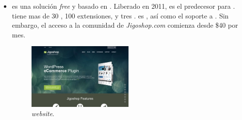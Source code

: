 \begin{itemize}
	\item \textbf{\nameJigoshop} es una solución \ecommerce \textit{free} y \opensource basado en \wordPress. Liberado en 2011, \nameJigoshop es el predecesor para \nameWooCommerce. \nameJigoshop tiene mas de 30   \themes, 100 extensiones, y tres \theme \frameworks. \nameJigoshop es  \free, así como el soporte a \wordPressOrg. Sin embargo, el acceso a la comunidad de \textit{Jigoshop.com} comienza desde \$40 por mes.

	\begin{figure}[h!]
		\centering
		\includegraphics[width=0.5\textwidth]{figuras/cap1/JigoshopWebsite.jpg}
		\caption{\nameJigoshop \textit{website}\cite{online_Jigoshop}.}
	\end{figure}

\end{itemize}

